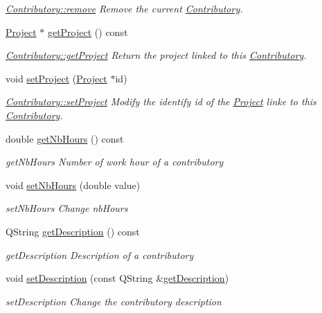 \begin{DoxyCompactItemize}
\begin{DoxyCompactList}\small\item\em \hyperlink{classContributory_a59641dbc35947c31eb841b46fed6130f}{Contributory\+::remove} Remove the current \hyperlink{classContributory}{Contributory}. \end{DoxyCompactList}\item 
\hyperlink{classProject}{Project} $\ast$ \hyperlink{classContributory_ab36c08e9844bc327e196a472733ac417}{get\+Project} () const 
\begin{DoxyCompactList}\small\item\em \hyperlink{classContributory_ab36c08e9844bc327e196a472733ac417}{Contributory\+::get\+Project} Return the project linked to this \hyperlink{classContributory}{Contributory}. \end{DoxyCompactList}\item 
void \hyperlink{classContributory_a72088580dc62d1d7a1a7674f8ab9a492}{set\+Project} (\hyperlink{classProject}{Project} $\ast$id)
\begin{DoxyCompactList}\small\item\em \hyperlink{classContributory_a72088580dc62d1d7a1a7674f8ab9a492}{Contributory\+::set\+Project} Modify the identify {\itshape id} of the \hyperlink{classProject}{Project} linke to this \hyperlink{classContributory}{Contributory}. \end{DoxyCompactList}\item 
double \hyperlink{classContributory_a01eccd2a6cea09c295bd808a08d27efe}{get\+Nb\+Hours} () const 
\begin{DoxyCompactList}\small\item\em get\+Nb\+Hours Number of work hour of a contributory \end{DoxyCompactList}\item 
void \hyperlink{classContributory_a32d589c7cb5269aad6c70ad6703c4d58}{set\+Nb\+Hours} (double value)
\begin{DoxyCompactList}\small\item\em set\+Nb\+Hours Change nb\+Hours \end{DoxyCompactList}\item 
Q\+String \hyperlink{classContributory_ae960d1562ede18bbddd2d8bccea762b7}{get\+Description} () const 
\begin{DoxyCompactList}\small\item\em get\+Description Description of a contributory \end{DoxyCompactList}\item 
void \hyperlink{classContributory_a76af91dd9dfb28cc59fcc9685db8d3e5}{set\+Description} (const Q\+String \&\hyperlink{classContributory_ae960d1562ede18bbddd2d8bccea762b7}{get\+Description})
\begin{DoxyCompactList}\small\item\em set\+Description Change the contributory description \end{DoxyCompactList}\end{DoxyCompactItemize}
